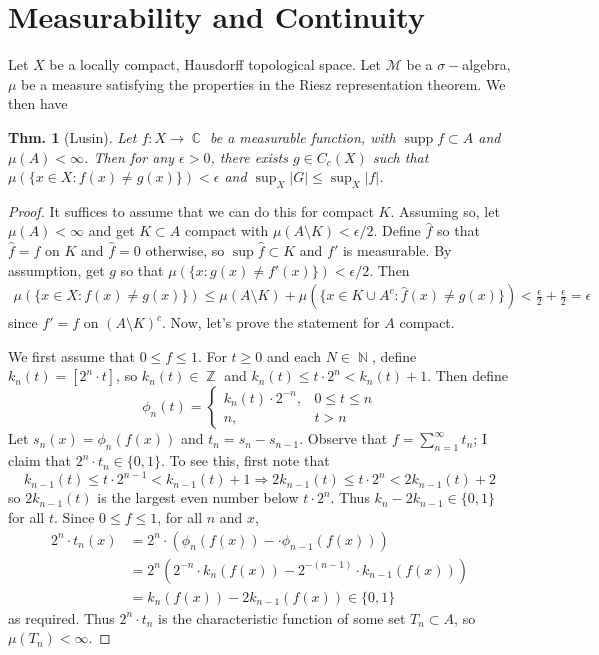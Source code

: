 \documentclass[12pt, a4paper]{book}
\DeclareMathOperator{\N}{\mathbb{N}}
\DeclareMathOperator{\Z}{\mathbb{Z}}
\DeclareMathOperator{\C}{\mathbb{C}}
\DeclareMathOperator{\supp}{supp}
\newtheorem{theorem}{Thm.}[section]
\theoremstyle{nonumberplain}
\newtheorem{proof}{Proof}
\begin{document}
\section{Measurability and Continuity}
Let $X$ be a locally compact, Hausdorff topological space.
Let $\mathcal{M}$ be a $\sigma-$algebra, $\mu$ be a measure satisfying the properties in the Riesz representation theorem.
We then have
\begin{theorem}[Lusin]
    Let $f:X\to\C$ be a measurable function, with $\supp f\subset A$ and $\mu(A)<\infty$.
    Then for any $\epsilon>0$, there exists $g\in C_c(X)$ such that $\mu(\{x\in X:f(x)\neq g(x)\})<\epsilon$ and $\sup_X|G|\leq\sup_X|f|$.
\end{theorem}
\begin{proof}
    It suffices to assume that we can do this for compact $K$.
    Assuming so, let $\mu(A)<\infty$ and get $K\subset A$ compact with $\mu(A\setminus K)<\epsilon/2$.
    Define $\hat f$ so that $\hat f=f$ on $K$ and $\hat f=0$ otherwise, so $\sup\hat f\subset K$ and $f'$ is measurable.
    By assumption, get $g$ so that $\mu(\{x:g(x)\neq f'(x)\})<\epsilon/2$.
    Then
    \begin{align*}
        \mu\left(\{x\in X:f(x)\neq g(x)\}\right) \leq \mu(A\setminus K)+\mu\left(\{x\in K\cup A^c:\hat f(x)\neq g(x)\}\right)< \frac{\epsilon}{2}+\frac{\epsilon}{2}=\epsilon
    \end{align*}
    since $f'=f$ on $(A\setminus K)^c$.
    Now, let's prove the statement for $A$ compact.

    We first assume that $0\leq f\leq 1$.
    For $t\geq 0$ and each $N\in\N$, define $k_n(t)=[2^n\cdot t]$, so $k_n(t)\in\Z$ and $k_n(t)\leq t\cdot 2^n<k_n(t)+1$.
    Then define
    \[\phi_n(t)=
        \begin{cases}
            k_n(t)\cdot 2^{-n},&0\leq t\leq n\\
            n,&t >n
        \end{cases}
    \]
    Let $s_n(x)=\phi_n(f(x))$ and $t_n=s_n-s_{n-1}$.
    Observe that $f=\sum\limits_{n=1}^\infty t_n$; I claim that $2^n\cdot t_n\in\{0,1\}$.
    To see this, first note that
    \[k_{n-1}(t)\leq t\cdot 2^{n-1}<k_{n-1}(t)+1\Longrightarrow 2k_{n-1}(t)\leq t\cdot 2^n<2k_{n-1}(t)+2\]
    so $2k_{n-1}(t)$ is the largest even number below $t\cdot 2^n$.
    Thus $k_n-2k_{n-1}\in\{0,1\}$ for all $t$.
    Since $0\leq f\leq 1$, for all $n$ and $x$,
    \begin{align*}
        2^n\cdot t_n(x) &= 2^n\cdot \left(\phi_n(f(x))-\cdot \phi_{n-1}(f(x))\right)\\
                        &=2^n\left(2^{-n}\cdot k_n(f(x))-2^{-(n-1)}\cdot k_{n-1}(f(x))\right)\\
                        &= k_n(f(x))-2k_{n-1}(f(x))\in\{0,1\}
    \end{align*}
    as required.
    Thus $2^n\cdot t_n$ is the characteristic function of some set $T_n\subset A$, so $\mu(T_n)<\infty$.


\end{proof}
\end{document}
